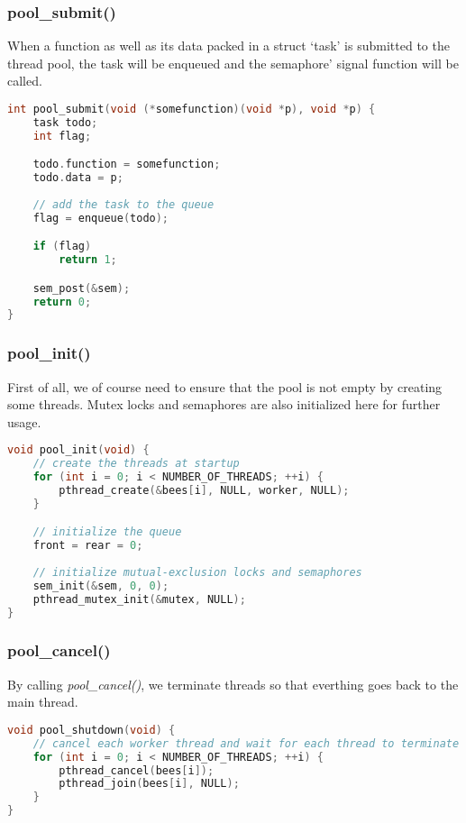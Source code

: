 \documentclass{article}
\begin{document}
\subsubsection*{pool\_submit()} When a function as well as its data packed in a struct `task' is submitted to the thread pool, the task will be enqueued and the semaphore' signal function will be called.

\begin{lstlisting}[language=c, caption={pool\_submit()}]
int pool_submit(void (*somefunction)(void *p), void *p) {
    task todo;
    int flag;

    todo.function = somefunction;
    todo.data = p;
    
    // add the task to the queue
    flag = enqueue(todo);

    if (flag) 
        return 1;

    sem_post(&sem);
    return 0;
}
\end{lstlisting}

\subsubsection*{pool\_init()} 
First of all, we of course need to ensure that the pool is not empty by creating some threads. Mutex locks and semaphores are also initialized here for further usage.

\begin{lstlisting}[language=c, caption={pool\_init()}]
void pool_init(void) {
    // create the threads at startup
    for (int i = 0; i < NUMBER_OF_THREADS; ++i) {
        pthread_create(&bees[i], NULL, worker, NULL);
    }

    // initialize the queue
    front = rear = 0;
    
    // initialize mutual-exclusion locks and semaphores
    sem_init(&sem, 0, 0);
    pthread_mutex_init(&mutex, NULL);
}
\end{lstlisting}

\subsubsection*{pool\_cancel()}
By calling \textit{pool\_cancel()}, we terminate threads so that everthing goes back to the main thread.

\begin{lstlisting}[language=c, caption={pool\_cancel()}]
void pool_shutdown(void) {
    // cancel each worker thread and wait for each thread to terminate
    for (int i = 0; i < NUMBER_OF_THREADS; ++i) {
        pthread_cancel(bees[i]);
        pthread_join(bees[i], NULL);
    }
}
\end{lstlisting}
\end{document}
